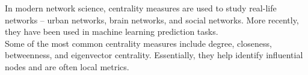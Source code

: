 \documentclass[preview]{standalone}
\begin{document}
In modern network science, centrality measures are used to study real-life networks -- urban networks, brain networks, and social networks. More recently, they have been used in machine learning prediction tasks.\\Some of the most common centrality measures include degree, closeness, betweenness, and eigenvector centrality. Essentially, they help identify influential nodes and are often local metrics.\\
\end{document}
